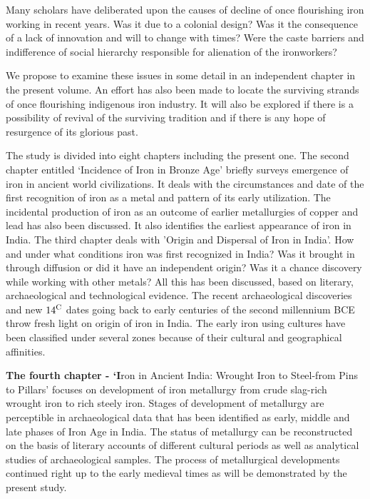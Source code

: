 Many scholars have deliberated upon the causes of decline of once flourishing iron working in recent years. Was it due to a colonial design? Was it the consequence of a lack of innovation and will to change with times? Were the caste barriers and indifference of social hierarchy responsible for alienation of the ironworkers?

We propose to examine these issues in some detail in an independent chapter in the present volume. An effort has also been made to locate the surviving strands of once flourishing indigenous iron industry. It will also be explored if there is a possibility of revival of the surviving tradition and if there is any hope of resurgence of its glorious past.

The study is divided into eight chapters including the present one. The second chapter entitled `Incidence of Iron in Bronze Age' briefly surveys emergence of iron in ancient world civilizations. It deals with the circumstances and date of the first recognition of iron as a metal and pattern of its early utilization. The incidental production of iron as an outcome of earlier metallurgies of copper and lead has also been discussed. It also identifies the earliest appearance of iron in India. The third chapter deals with 'Origin and Dispersal of Iron in India'. How and under what conditions iron was first recognized in India? Was it brought in through diffusion or did it have an independent origin? Was it a chance discovery while working with other metals? All this has been discussed, based on literary, archaeological and technological evidence. The recent archaeological discoveries and new ${14}^{\rm C}$ dates going back to early centuries of the second millennium BCE throw fresh light on origin of iron in India. The early iron using cultures have been classified under several zones because of their cultural and geographical affinities.

\textbf{The fourth chapter - ‘I}ron in Ancient India: Wrought Iron to Steel-from Pins to Pillars’ focuses on development of iron metallurgy from crude slag-rich wrought iron to rich steely iron. Stages of development of metallurgy are perceptible in archaeological data that has been identified as early, middle and late phases of Iron Age in India. The status of metallurgy can be reconstructed on the basis of literary accounts of different cultural periods as well as analytical studies of archaeological samples. The process of metallurgical developments continued right up to the early medieval times as will be demonstrated by the present study.


